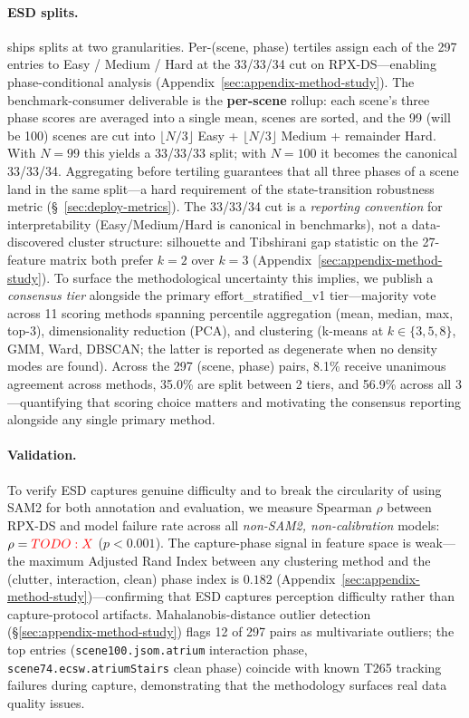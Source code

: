 \paragraph{ESD splits.}
\coolname{} ships splits at two granularities. Per-(scene, phase) tertiles assign each of the 297 entries to Easy / Medium / Hard at the 33/33/34 cut on RPX-DS---enabling phase-conditional analysis (Appendix~\ref{sec:appendix-method-study}). The benchmark-consumer deliverable is the \textbf{per-scene} rollup: each scene's three phase scores are averaged into a single mean, scenes are sorted, and the 99 (will be 100) scenes are cut into $\lfloor N/3 \rfloor$ Easy + $\lfloor N/3 \rfloor$ Medium + remainder Hard. With $N=99$ this yields a 33/33/33 split; with $N=100$ it becomes the canonical 33/33/34. Aggregating before tertiling guarantees that all three phases of a scene land in the same split---a hard requirement of the state-transition robustness metric (\S~\ref{sec:deploy-metrics}).
The 33/33/34 cut is a \textit{reporting convention} for interpretability (Easy/Medium/Hard is canonical in benchmarks), not a data-discovered cluster structure: silhouette and Tibshirani gap statistic on the 27-feature matrix both prefer $k=2$ over $k=3$ (Appendix~\ref{sec:appendix-method-study}).
To surface the methodological uncertainty this implies, we publish a \textit{consensus tier} alongside the primary effort\_stratified\_v1 tier---majority vote across 11 scoring methods spanning percentile aggregation (mean, median, max, top-3), dimensionality reduction (PCA), and clustering (k-means at $k\!\in\!\{3,5,8\}$, GMM, Ward, DBSCAN; the latter is reported as degenerate when no density modes are found).
Across the 297 (scene, phase) pairs, 8.1\% receive unanimous agreement across methods, 35.0\% are split between 2 tiers, and 56.9\% across all 3---quantifying that scoring choice matters and motivating the consensus reporting alongside any single primary method.

\paragraph{Validation.}
\label{sec:esd-validation}
To verify ESD captures genuine difficulty and to break the circularity of using SAM2 for both annotation and evaluation, we measure Spearman $\rho$ between RPX-DS and model failure rate across all \textit{non-SAM2, non-calibration} models: $\rho = \textcolor{red}{TODO: X}$ ($p < 0.001$).
The capture-phase signal in feature space is weak---the maximum Adjusted Rand Index between any clustering method and the (clutter, interaction, clean) phase index is $0.182$ (Appendix~\ref{sec:appendix-method-study})---confirming that ESD captures perception difficulty rather than capture-protocol artifacts.
Mahalanobis-distance outlier detection (\S\ref{sec:appendix-method-study}) flags 12 of 297 pairs as multivariate outliers; the top entries (\texttt{scene100.jsom.atrium} interaction phase, \texttt{scene74.ecsw.atriumStairs} clean phase) coincide with known T265 tracking failures during capture, demonstrating that the methodology surfaces real data quality issues.

